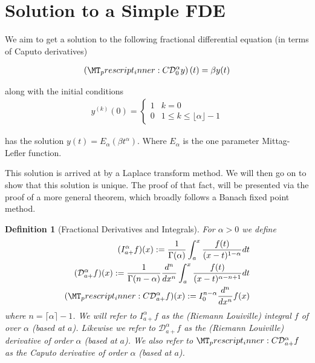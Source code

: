 \documentclass{article}
\begin{document}
\setlength\parindent{0pt}
\setlength{\parskip}{5mm plus4mm minus3mm}
\fancyfoot[r]{\today}
\newtheorem{theorem}{Theorem}
\newtheorem{lemma}{Lemma}
\newtheorem{definition}{Definition}
\newcommand{\laplace}[1]{ \mathcal{L} \left\{ #1 \right\} }
\newcommand{\rld}[3]{ \left( \mathcal{D}_{#1}^{#2} #3 \right) }
\newcommand{\rli}[3]{ \left( I_{#1}^{#2} #3 \right) }
\newcommand{\der}[3]{ \frac{d^{#3}#1}{d#2^{#3}} }
\newcommand{\capder}[3]{ \left( \prescript{C}{}{\mathcal{D}_{#1}^{#2}} #3 \right) }
\section*{Solution to a Simple FDE}

We aim to get a solution to the following fractional differential equation (in terms of Caputo derivatives)


\begin{align*}
	\left( \prescript{C}{}{\mathcal{D}_0^\alpha}y \right)(t) = \beta y(t) 
\end{align*}

along with the initial conditions 
\begin{align*}
	y^{(k)}(0) = 
	\begin{cases}
		1 & k = 0 \\
		0 & 1 \leq k \leq \lfloor \alpha \rfloor - 1  
	\end{cases}
\end{align*}

has the solution $ y(t) = E_\alpha \left( \beta t^\alpha \right) $. Where $ E_\alpha $ is the one parameter Mittag-Lefler function.

This solution is arrived at by a Laplace transform method. We will then go on to show that this solution is unique. The proof of that fact, will be 
presented via the proof of a more general theorem, which broadly follows a Banach fixed point method. 

\begin{definition}[Fractional Derivatives and Integrals]
	For $ \alpha > 0 $ we define
	\begin{align*}
		(I_{a+}^{\alpha}f)(x) := \frac{1}{\Gamma(\alpha)}\int_a^x \frac{f(t)}{(x-t)^{1 - \alpha}} dt \\
		(\mathcal{D}_{a+}^{\alpha}f)(x) := \frac{1}{\Gamma(n-\alpha)} \frac{d^n}{dx^n}\int_a^x \frac{f(t)}{(x-t)^{\alpha - n + 1}} dt \\
		(\prescript{C}{}{\mathcal{D}}_{a+}^\alpha f)(x) := I_{0}^{n-\alpha} \frac{d^n}{dx^n}f(x) 
	\end{align*}
	where $ n  = \lceil \alpha \rceil - 1$.
	We will refer to $ I_{a+}^\alpha f$ as the (Riemann Louiville) integral $ f $ of over $ \alpha $ (based at $ a $).
	Likewise we refer to $ \mathcal{D}_{a+}^\alpha f $ as the (Riemann Louiville) derivative of order $ \alpha $ (based at $ a $).
	We also refer to $ \prescript{C}{}{\mathcal{D}}_{a+}^\alpha f $ as the Caputo derivative of order $ \alpha $ (based at $ a $).
	
\end{definition}
\end{document}
